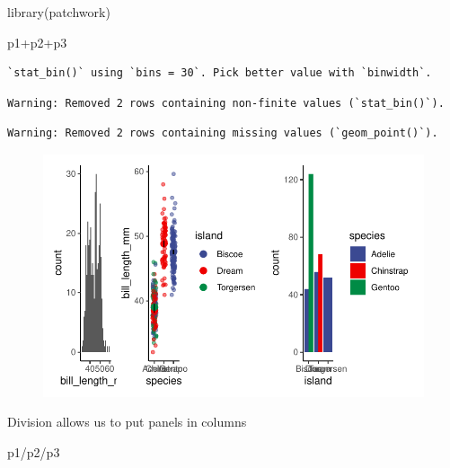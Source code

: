 \documentclass[
  letterpaper,
  DIV=11,
  numbers=noendperiod]{scrartcl}
\newenvironment{Shaded}{\begin{snugshade}}{\end{snugshade}}
\newcommand{\FunctionTok}[1]{\textcolor[rgb]{0.28,0.35,0.67}{#1}}
\newcommand{\NormalTok}[1]{\textcolor[rgb]{0.00,0.23,0.31}{#1}}
\newcommand{\SpecialCharTok}[1]{\textcolor[rgb]{0.37,0.37,0.37}{#1}}
\begin{document}
\begin{Shaded}
\begin{Highlighting}[]
\FunctionTok{library}\NormalTok{(patchwork)}

\NormalTok{p1}\SpecialCharTok{+}\NormalTok{p2}\SpecialCharTok{+}\NormalTok{p3}
\end{Highlighting}
\end{Shaded}

\begin{verbatim}
`stat_bin()` using `bins = 30`. Pick better value with `binwidth`.
\end{verbatim}

\begin{verbatim}
Warning: Removed 2 rows containing non-finite values (`stat_bin()`).
\end{verbatim}

\begin{verbatim}
Warning: Removed 2 rows containing missing values (`geom_point()`).
\end{verbatim}

\begin{figure}[H]

{\centering \includegraphics{facets_files/figure-pdf/unnamed-chunk-7-1.pdf}

}

\end{figure}

Division allows us to put panels in columns

\begin{Shaded}
\begin{Highlighting}[]
\NormalTok{p1}\SpecialCharTok{/}\NormalTok{p2}\SpecialCharTok{/}\NormalTok{p3}
\end{Highlighting}
\end{Shaded}
\end{document}
